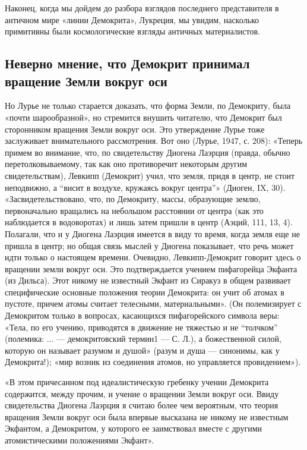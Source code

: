 Наконец, когда мы дойдем  до разбора взглядов последнего представителя
в  античном мире  «линии  Демокрита», Лукреция,  мы увидим,  насколько
примитивны были космологические взгляды античных материалистов.

\subsection{Неверно  мнение,  что  Демокрит  принимал  вращение  Земли
вокруг оси}

Но Лурье не только старается  доказать, что форма Земли, по Демокриту,
была «почти шарообразной», но стремится внушить читателю, что Демокрит
был сторонником вращения Земли вокруг  оси. Это утверждение Лурье тоже
заслуживает внимательного рассмотрения. Вот оно (Лурье, 1947, с. 208):
«Теперь  примем во  внимание,  что, по  свидетельству Диогена  Лаэрция
(правда, обычно перетолковываемому, так как оно противоречит некоторым
другим свидетельствам),  Левкипп (Демокрит)  учил, что земля,  придя в
центр,  не стоит  неподвижно,  а ``висит  в  воздухе, кружаясь  вокруг
центра''» (Диоген,  IX, 30). «Засвидетельствовано, что,  по Демокриту,
массы,   образующие  землю,   первоначально  вращались   на  небольшом
расстоянии от центра (как это  наблюдается в водоворотах) и лишь затем
пришли в центр (Аэций, 111, 13,  4). Полагали, что и у Диогена Лаэрция
имеется в виду то  время, когда земля еще не пришла  в центр; но общая
связь  мыслей у  Диогена  показывает,  что речь  может  идти только  о
настоящем времени. Очевидно, Левкипп-Демокрит говорит здесь о вращении
земли вокруг  оси. Это подтверждается учением  пифагорейца Экфанта (из
Дильса). Этот никому не известный  Экфант из Сиракуз в общем развивает
специфические основные  положения теории Демокрита: он  учит об атомах
в  пустоте,  причем  атомы   считает  телесными,  материальными».  (Он
полемизирует с Демокритом только в вопросах, касающихся пифагорейского
символа веры: «Тела, по его  учению, приводятся в движение не тяжестью
и не ``толчком'' (полемика: ... --- демокритовский термин1 --- С. Л.),
а божественной  силой, которую он  называет разумом и душой»  (разум и
душа  ---  синонимы, как  у  Демокрита!);  «мир возник  из  соединения
атомов, но управляется провидением»).

«В  этом причесанном  под  идеалистическую  гребенку учении  Демокрита
содержится, между прочим, и учение  о вращении Земли вокруг оси. Ввиду
свидетельства Диогена Лаэрция я считаю более чем вероятным, что теория
вращения  Земли  вокруг  оси  была  впервые  высказана  не  никому  не
известным Экфантом, а  Демокритом, у которого ее  заимствовал вместе с
другими атомистическими положениями Экфант».

